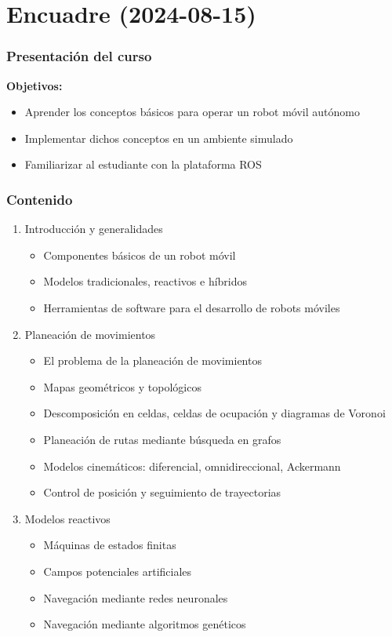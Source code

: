 \section{Encuadre (2024-08-15)}
\begin{frame}\frametitle{Presentación del curso}
  \textbf{Objetivos:}
  \begin{itemize}
  \item Aprender los conceptos básicos para operar un robot móvil autónomo
  \item Implementar dichos conceptos en un ambiente simulado
  \item Familiarizar al estudiante con la plataforma ROS
  \end{itemize}
\end{frame}

\begin{frame}\frametitle{Contenido}
  \begin{enumerate}
  \item Introducción y generalidades
    \begin{itemize}
    \item Componentes básicos de un robot móvil
    \item Modelos tradicionales, reactivos e híbridos
    \item Herramientas de software para el desarrollo de robots móviles
    \end{itemize}
  \item Planeación de movimientos
    \begin{itemize}
    \item El problema de la planeación de movimientos
    \item Mapas geométricos y topológicos
    \item Descomposición en celdas, celdas de ocupación y diagramas de Voronoi
    \item Planeación de rutas mediante búsqueda en grafos
    \item Modelos cinemáticos: diferencial, omnidireccional, Ackermann
    \item Control de posición y seguimiento de trayectorias
    \end{itemize}
  \item Modelos reactivos
    \begin{itemize}
    \item Máquinas de estados finitas
    \item Campos potenciales artificiales
    \item Navegación mediante redes neuronales
    \item Navegación mediante algoritmos genéticos
    \end{itemize}
  \end{enumerate}
\end{frame}

